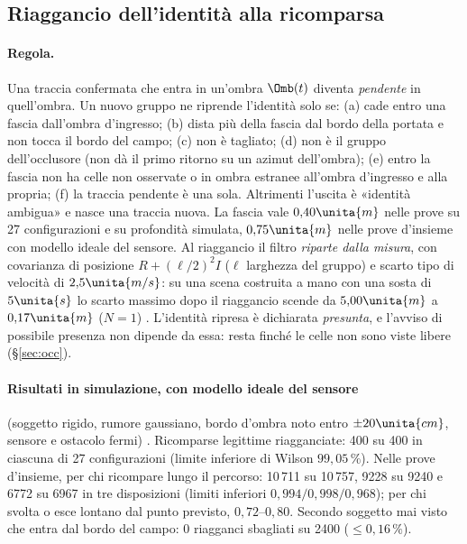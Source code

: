 \subsection{Riaggancio dell'identità alla ricomparsa}\label{sec:sti-riaggancio}

\paragraph{Regola.} Una traccia confermata che entra in un'ombra $\Omb(t)$ diventa \emph{pendente} in quell'ombra. Un nuovo gruppo ne riprende l'identità solo se: (a) cade entro una fascia dall'ombra d'ingresso; (b) dista più della fascia dal bordo della portata e non tocca il bordo del campo; (c) non è tagliato; (d) non è il gruppo dell'occlusore (non dà il primo ritorno su un azimut dell'ombra); (e) entro la fascia non ha celle non osservate o in ombra estranee all'ombra d'ingresso e alla propria; (f) la traccia pendente è una sola. Altrimenti l'uscita è «identità ambigua» e nasce una traccia nuova. La fascia vale $0{,}40\unita{m}$ nelle prove su 27 configurazioni e su profondità simulata, $0{,}75\unita{m}$ nelle prove d'insieme con modello ideale del sensore. Al riaggancio il filtro \emph{riparte dalla misura}, con covarianza di posizione $R+(\ell/2)^2I$ ($\ell$ larghezza del gruppo) e scarto tipo di velocità di $2{,}5\unita{m/s}$: su una scena costruita a mano con una sosta di $5\unita{s}$ lo scarto massimo dopo il riaggancio scende da $5{,}00\unita{m}$ a $0{,}17\unita{m}$ ($N=1$) . L'identità ripresa è dichiarata \emph{presunta}, e l'avviso di possibile presenza non dipende da essa: resta finché le celle non sono viste libere (\S\ref{sec:occ}).

\paragraph{Risultati in simulazione, con modello ideale del sensore} (soggetto rigido, rumore gaussiano, bordo d'ombra noto entro $\pm20\unita{cm}$, sensore e ostacolo fermi) . Ricomparse legittime riagganciate: 400 su 400 in ciascuna di 27 configurazioni (limite inferiore di Wilson $99{,}05\,\%$). Nelle prove d'insieme, per chi ricompare lungo il percorso: 10\,711 su 10\,757, 9228 su 9240 e 6772 su 6967 in tre disposizioni (limiti inferiori $0{,}994/0{,}998/0{,}968$); per chi svolta o esce lontano dal punto previsto, $0{,}72$--$0{,}80$. Secondo soggetto mai visto che entra dal bordo del campo: 0 riagganci sbagliati su 2400 ($\le0{,}16\,\%$).

